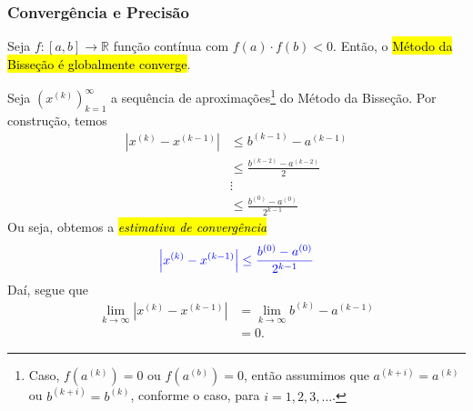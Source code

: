 \subsubsection{Convergência e Precisão}

\begin{teo}\label{cap_eq1d_sec_bissec:teo:convp}
  Seja $f:[a, b]\to\mathbb{R}$ função contínua com $f(a)\cdot f(b) < 0$. Então, o \hl{Método da Bisseção é globalmente converge}.
\end{teo}
\begin{dem}
  Seja $(x^{(k)})_{k=1}^\infty$ a sequência de aproximações\footnote{Caso, $f\left(a^{(k)}\right)=0$ ou $f\left(a^{(b)}\right)=0$, então assumimos que $a^{(k+i)} = a^{(k)}$ ou $b^{(k+i)} = b^{(k)}$, conforme o caso, para $i=1,2,3,\ldots$.} do Método da Bisseção. Por construção, temos
  \begin{align}
    \left|x^{(k)} - x^{(k-1)}\right| &\leq b^{(k-1)}-a^{(k-1)}\\
                                     &\leq \frac{b^{(k-2)}-a^{(k-2)}}{2}\\
                                     &\vdots\\
                                     &\leq \frac{b^{(0)}-a^{(0)}}{2^{k-1}}
  \end{align}
  Ou seja, obtemos a \hl{\emph{estimativa de convergência}}
  \begin{equation}\label{cap_eq1d_sec_bissec:eq:estconvp}
    {\color{blue}\left|x^{(k)} - x^{(k-1)}\right| \leq \frac{b^{(0)}-a^{(0)}}{2^{k-1}}}
  \end{equation}
  Daí, segue que
  \begin{align}
    \lim_{k\to\infty} \left|x^{(k)}-x^{(k-1)}\right| &= \lim_{k\to\infty} b^{(k)}-a^{(k-1)}\\
                                                     &= 0.
  \end{align}
\end{dem}

